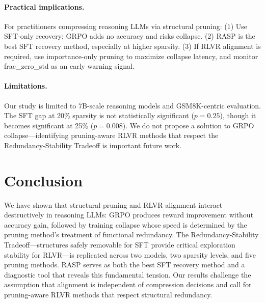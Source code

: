 \documentclass[11pt]{article}
\begin{document}
\paragraph{Practical implications.}
For practitioners compressing reasoning LLMs via structural pruning:
(1) Use SFT-only recovery; GRPO adds no accuracy and risks collapse.
(2) RASP is the best SFT recovery method, especially at higher sparsity.
(3) If RLVR alignment is required, use importance-only pruning to maximize collapse latency, and monitor frac\_zero\_std as an early warning signal.

\paragraph{Limitations.}
Our study is limited to 7B-scale reasoning models and GSM8K-centric evaluation.
The SFT gap at 20\% sparsity is not statistically significant ($p{=}0.25$), though it becomes significant at 25\% ($p{=}0.008$).
We do not propose a solution to GRPO collapse---identifying pruning-aware RLVR methods that respect the Redundancy-Stability Tradeoff is important future work.

\section{Conclusion}

We have shown that structural pruning and RLVR alignment interact destructively in reasoning LLMs: GRPO produces reward improvement without accuracy gain, followed by training collapse whose speed is determined by the pruning method's treatment of functional redundancy.
The Redundancy-Stability Tradeoff---structures safely removable for SFT provide critical exploration stability for RLVR---is replicated across two models, two sparsity levels, and five pruning methods.
RASP serves as both the best SFT recovery method and a diagnostic tool that reveals this fundamental tension.
Our results challenge the assumption that alignment is independent of compression decisions and call for pruning-aware RLVR methods that respect structural redundancy.


\end{document}
